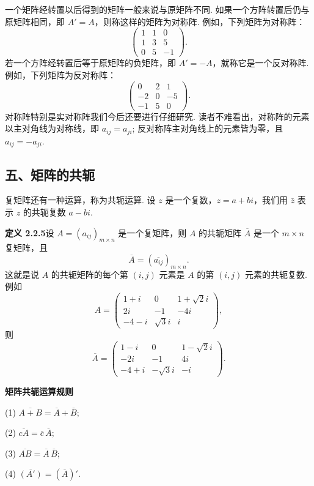 \documentclass[UTF8,12pt,a4paper,fontset=fandol]{ctexart}
\begin{document}
一个矩阵经转置以后得到的矩阵一般来说与原矩阵不同. 如果一个方阵转置后仍与原矩阵相同，即 $A'=A$，则称这样的矩阵为对称阵. 例如，下列矩阵为对称阵：
\[
\left(\begin{array}{ccc}
1 & 1 & 0\\
1 & 3 & 5\\
0 & 5 & -1
\end{array}\right).
\]
若一个方阵经转置后等于原矩阵的负矩阵，即 $A'=-A$，就称它是一个反对称阵. 例如，下列矩阵为反对称阵：
\[
\left(\begin{array}{ccc}
0 & 2 & 1\\
-2 & 0 & -5\\
-1 & 5 & 0
\end{array}\right).
\]
对称阵特别是实对称阵我们今后还要进行仔细研究. 读者不难看出，对称阵的元素以主对角线为对称线，即 $a_{ij}=a_{ji}$; 反对称阵主对角线上的元素皆为零，且 $a_{ij}=-a_{ji}$.

\subsection*{五、矩阵的共轭}

复矩阵还有一种运算，称为共轭运算. 设 $z$ 是一个复数，$z=a+bi$，我们用 $\bar z$ 表示 $z$ 的共轭复数 $a-bi$.

\noindent\textbf{定义 2.2.5}\quad 设 $A=(a_{ij})_{m\times n}$ 是一个复矩阵，则 $A$ 的共轭矩阵 $\overline{A}$ 是一个 $m\times n$ 复矩阵，且
\[
\overline{A}=(\overline{a_{ij}})_{m\times n}.
\]
这就是说 $A$ 的共轭矩阵的每个第 $(i,j)$ 元素是 $A$ 的第 $(i,j)$ 元素的共轭复数. 例如
\[
A=\left(\begin{array}{ccc}
1+i & 0 & 1+\sqrt{2}i\\
2i & -1 & -4i\\
-4-i & \sqrt{3}i & i
\end{array}\right),
\]
则
\[
\overline{A}=\left(\begin{array}{ccc}
1-i & 0 & 1-\sqrt{2}i\\
-2i & -1 & 4i\\
-4+i & -\sqrt{3}i & -i
\end{array}\right).
\]

\noindent\textbf{矩阵共轭运算规则}

(1) $\overline{A+B}=\overline{A}+\overline{B}$;

(2) $\overline{cA}=\bar c\,\overline{A}$;

(3) $\overline{AB}=\overline{A}\,\overline{B}$;

(4) $\overline{(A')}=(\overline{A})'$.
\end{document}

